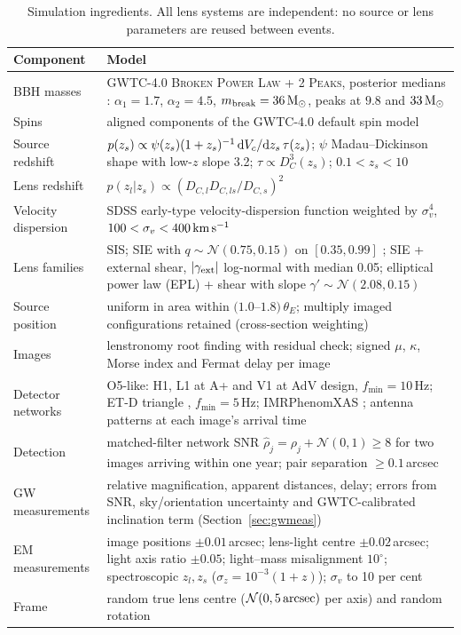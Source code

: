\begin{table}
\centering\papertablestyle
\caption{Simulation ingredients. All lens systems are independent: no source or lens parameters are reused between events.}
\label{tab:simulation}
\begin{tabularx}{\linewidth}{@{}p{.18\linewidth}L@{}}
\toprule
Component & Model \\
\midrule
BBH masses & GWTC-4.0 \textsc{Broken Power Law + 2 Peaks}, posterior medians \citep{lvk2025gwtc4pop}: $\alpha_1=1.7$, $\alpha_2=4.5$, $m_{\rm break}=36\,{\rm M_\odot}$, peaks at $9.8$ and $33\,{\rm M_\odot}$ \\
Spins & aligned components of the GWTC-4.0 default spin model \\
Source redshift & $p(z_s)\propto \psi(z_s)(1+z_s)^{-1}\,{\rm d}V_c/{\rm d}z_s\,\tau(z_s)$; $\psi$ Madau--Dickinson shape with low-$z$ slope 3.2; $\tau\propto D_C^3(z_s)$; $0.1<z_s<10$ \\
Lens redshift & $p(z_l|z_s)\propto (D_{C,l}D_{C,ls}/D_{C,s})^2$ \citep{turner1984statistics} \\
Velocity dispersion & SDSS early-type velocity-dispersion function \citep{choi2007vdf} weighted by $\sigma_v^4$, $100<\sigma_v<400\,{\rm km\,s^{-1}}$ \\
Lens families & SIS; SIE with $q\sim\mathcal N(0.75,0.15)$ on $[0.35,0.99]$ \citep{bolton2008slacs}; SIE + external shear, $|\gamma_{\rm ext}|$ log-normal with median 0.05; elliptical power law (EPL) + shear with slope $\gamma'\sim\mathcal N(2.08,0.15)$ \citep{auger2010slacs,tessore2015epl} \\
Source position & uniform in area within $(1.0$--$1.8)\,\theta_E$; multiply imaged configurations retained (cross-section weighting) \\
Images & lenstronomy \citep{birrer2018lenstronomy,birrer2021lenstronomy} root finding with residual check; signed $\mu$, $\kappa$, Morse index and Fermat delay per image \\
Detector networks & O5-like: H1, L1 at A+ and V1 at AdV design, $f_{\min}=10$\,Hz; ET-D triangle \citep{hild2011etd}, $f_{\min}=5$\,Hz; IMRPhenomXAS \citep{pratten2020xas}; antenna patterns at each image's arrival time \\
Detection & matched-filter network SNR $\hat\rho_j=\rho_j+\mathcal N(0,1)\ge8$ for two images arriving within one year; pair separation $\ge0.1$\,arcsec \\
GW measurements & relative magnification, apparent distances, delay; errors from SNR, sky/orientation uncertainty and GWTC-calibrated inclination term (Section~\ref{sec:gwmeas}) \\
EM measurements & image positions $\pm0.01$\,arcsec; lens-light centre $\pm0.02$\,arcsec; light axis ratio $\pm0.05$; light--mass misalignment $10^\circ$; spectroscopic $z_l,z_s$ ($\sigma_z=10^{-3}(1+z)$); $\sigma_v$ to 10 per cent \\
Frame & random true lens centre ($\mathcal N(0,5\,{\rm arcsec})$ per axis) and random rotation \\
\bottomrule
\end{tabularx}
\end{table}

